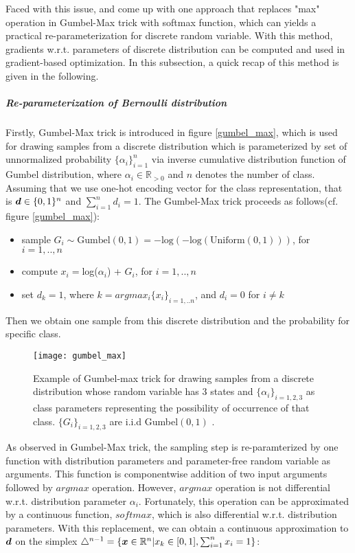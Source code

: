 Faced with this issue, \cite{jang2016categorical} and \cite{maddison2016concrete} come up with one approach that replaces "max" operation in Gumbel-Max trick with softmax function, which can yields a practical re-parameterization for discrete random variable. With this method, gradients w.r.t. parameters of discrete distribution can be computed and used in gradient-based optimization. In this subsection, a quick recap of this method is given in the following.

\subparagraph{Re-parameterization of Bernoulli distribution}
Firstly, Gumbel-Max trick\cite{maddison2014sampling} is introduced in figure \ref{gumbel_max}, which is used for drawing samples from a discrete distribution which is parameterized by set of unnormalized probability $\{\alpha_i\}_{i=1}^{n}$ via inverse cumulative distribution function of Gumbel distribution, where $\alpha_i \in \mathbb R_{>0}$ and $n$ denotes the number of class. Assuming that we use one-hot encoding vector for the class representation, that is $\boldsymbol d \in \{0,1\}^n $ and $\sum_{i=1}^{n}d_i = 1$. The Gumbel-Max trick proceeds as follows(cf. figure \ref{gumbel_max}):
\begin{itemize}
	\item sample $G_i \sim \text{Gumbel}(0,1) = -\text{log}(-\text{log}(\text{Uniform}(0,1)))$, for $i=1,..,n$
	\item compute $x_i = $log($\alpha_i$) + $G_i$, for $i=1,..,n$
	\item set $d_k = 1$, where $k=argmax_i\{x_i\}_{i=1,..n}$, and $d_i = 0$ for $i \neq k$
\end{itemize}
Then we obtain one sample from this discrete distribution and the probability for specific class.

\begin{figure}[h!]
	\begin{center} \label{gumbel_max}
		\texttt{[image: gumbel\_max]}
		\caption{Example of Gumbel-max trick for drawing samples from a discrete distribution whose random variable has 3 states and $\{\alpha_{i}\}_{i=1,2,3}$ as class parameters representing the possibility of occurrence of that class. $\{G_{i}\}_{i=1,2,3}$ are i.i.d Gumbel$(0,1)$ \cite{maddison2016concrete}.}		
		\label{fig:gumbel_max}
	\end{center}
\end{figure}

As observed in Gumbel-Max trick, the sampling step is re-paramterized by one function with distribution parameters and parameter-free random variable as arguments. This function is componentwise addition of two input arguments followed by $argmax$ operation. However, $argmax$ operation is not differential w.r.t. distribution parameter $\alpha_i$. Fortunately, this operation can be approximated by a continuous function, $softmax$, which is also differential w.r.t. distribution parameters. With this replacement, we can obtain a continuous approximation to $\boldsymbol d$ on the simplex $\triangle^{n-1} = \{\boldsymbol x \in \mathbb R^n | x_k \in [0,1], \sum_{i=1}^{n} x_i = 1 \}$:

